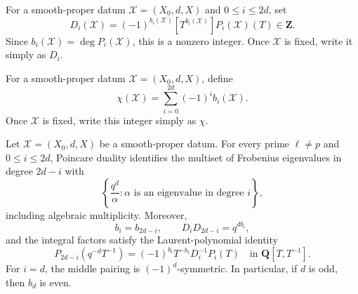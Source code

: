 

\begin{definition}
\label{def:determinant-constants}


For a smooth-proper datum \(\mathscr X=(X_0,d,X)\) and
\(0\leq i\leq2d\), set
\[
 D_i(\mathscr X)=
 (-1)^{b_i(\mathscr X)}
 [T^{b_i(\mathscr X)}]P_i(\mathscr X)(T)\in\mathbf Z.
\]
Since \(b_i(\mathscr X)=\deg P_i(\mathscr X)\), this is a nonzero integer.
Once \(\mathscr X\) is fixed, write it simply as \(D_i\).
\end{definition}


\begin{definition}
\label{def:euler-characteristic}


For a smooth-proper datum \(\mathscr X=(X_0,d,X)\), define
\[
 \chi(\mathscr X)=\sum_{i=0}^{2d}(-1)^ib_i(\mathscr X).
\]
Once \(\mathscr X\) is fixed, write this integer simply as \(\chi\).
\end{definition}


\begin{proposition}
\label{prop:duality-reciprocity}


Let \(\mathscr X=(X_0,d,X)\) be a smooth-proper datum.  For every prime
\(\ell\neq p\) and \(0\leq i\leq2d\), Poincare duality identifies the multiset of
Frobenius eigenvalues in degree \(2d-i\) with
\[
 \left\{\frac{q^d}{\alpha}:\alpha
 \text{ is an eigenvalue in degree }i\right\},
\]
including algebraic multiplicity.  Moreover,
\[
 b_i=b_{2d-i},
 \qquad
 D_iD_{2d-i}=q^{db_i},
\]
and the integral factors satisfy the Laurent-polynomial identity
\[
 P_{2d-i}(q^{-d}T^{-1})
 =(-1)^{b_i}T^{-b_i}D_i^{-1}P_i(T)
 \quad\text{in }\mathbf Q[T,T^{-1}].
\]
For \(i=d\), the middle pairing is \((-1)^d\)-symmetric.  In particular,
if \(d\) is odd, then \(b_d\) is even.
\end{proposition}

